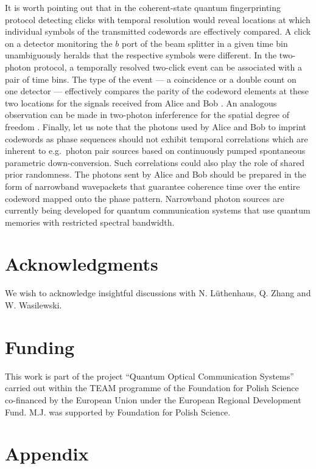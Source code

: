 \documentclass[10pt]{article}
\begin{document}
It is worth pointing out that in the coherent-state quantum fingerprinting protocol detecting clicks with temporal resolution would reveal locations at which individual symbols of the transmitted codewords are effectively compared. A click on a detector monitoring the $b$ port of the beam splitter in a given time bin unambiguously heralds that the respective symbols were different. In the two-photon protocol, a temporally resolved two-click event can be associated with a pair of time bins. The type of the event --- a coincidence or a double count on one detector --- effectively compares the parity of the codeword elements at these two locations for the signals received from Alice and Bob \cite{Rempe}. An analogous observation can be made in two-photon inferference for the spatial degree of freedom \cite{Holo}. Finally, let us note that the photons used by Alice and Bob to imprint codewords as phase sequences should not exhibit temporal correlations which are inherent to e.g.\ photon pair sources based on continuously pumped spontaneous parametric down-conversion. Such correlations could also play the role of shared prior randomness. The photons sent by Alice and Bob should be prepared in the form of narrowband wavepackets that guarantee coherence time over the entire codeword mapped onto the phase pattern. Narrowband photon sources are currently being developed for quantum communication systems that use quantum memories with restricted spectral bandwidth\cite{Fekete,Blatt}.

\section{Acknowledgments}
We wish to acknowledge insightful discussions with N. L\"{u}thenhaus, Q. Zhang and W. Wasilewski.

\section{Funding}
This work is part of the project ``Quantum Optical Communication Systems'' carried out within the TEAM
programme of the Foundation for Polish Science co-financed by the European Union under the European
Regional Development Fund. M.J. was supported by Foundation for Polish Science.

\appendix

\section*{Appendix}
\end{document}
